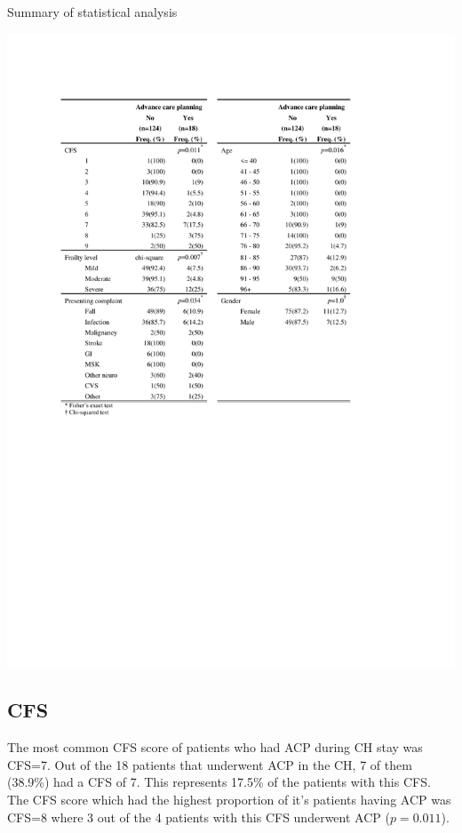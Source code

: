 \documentclass
[
	12pt,
	a4paper,
	oneside,
]{report}
\begin{document}
\begin{table}[ht]
\centering
\caption{Summary of statistical analysis}
\label{tab:statistics}
\includegraphics[width=\textwidth,
	trim={2.5cm 10cm 2.5cm 2.5cm},
	clip]{media/statistical-analysis}
\end{table}

\subsection{CFS}

The most common CFS score of patients 
who had ACP during CH stay was CFS=7. Out of the 18 patients that
underwent ACP in the CH, 7 of them (38.9\%) had a CFS of 7. This represents 
17.5\% of the patients with this CFS. The CFS score which had the highest 
proportion of it's patients having ACP was CFS=8 where 3 out of the 4 patients 
with this CFS underwent ACP ($p=0.011$). 
\end{document}
